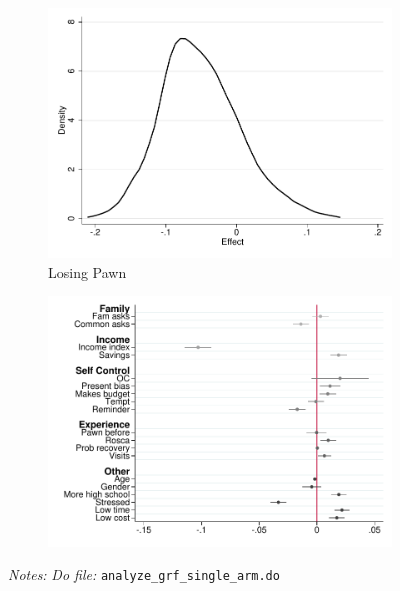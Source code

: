 \documentclass[11pt]{article}
\begin{document}
\begin{figure}[H]
\begin{center}
    \begin{subfigure}{0.4\textwidth}
        \caption{Losing Pawn}
        \centering
        \includegraphics[width=\textwidth]{Figuras/he_dist_def_c_pro_3.pdf}
    \end{subfigure}
    \begin{subfigure}{0.4\textwidth}
        \caption*{}
        \centering
        \includegraphics[width=\textwidth]{Figuras/HE/he_int_vertical_def_c_pro_3.pdf}
    \end{subfigure}
    \end{center}
     \footnotesize \textit{Notes: } 
      \footnotesize{ \textit{Do file: }  \texttt{analyze\_grf\_single\_arm.do}}
\end{figure}
\end{document}
